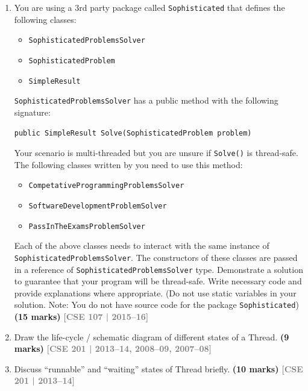 \documentclass[12pt,a3paper]{article}
\newcommand{\yr}[1]{\hfill\textcolor{gray}{\small\textbf{[#1]}}}
\newcommand{\mk}[1]{\textcolor{orange!70!black}{\small\textbf{(#1 marks)}}}
\begin{document}
\begin{enumerate}
\item You are using a 3rd party package called \texttt{Sophisticated} that defines the following classes:
\begin{itemize}
    \item \texttt{SophisticatedProblemsSolver}
    \item \texttt{SophisticatedProblem}
    \item \texttt{SimpleResult}
\end{itemize}
\texttt{SophisticatedProblemsSolver} has a public method with the following signature:
\begin{center}
    \texttt{public SimpleResult Solve(SophisticatedProblem problem)}
\centerline{}
\end{center}
Your scenario is multi-threaded but you are unsure if \texttt{Solve()} is thread-safe. The following classes written by you need to use this method:
\begin{itemize}
    \item \texttt{CompetativeProgrammingProblemsSolver}
    \item \texttt{SoftwareDevelopmentProblemSolver}
    \item \texttt{PassInTheExamsProblemSolver}
\end{itemize}
Each of the above classes needs to interact with the same instance of \texttt{SophisticatedProblemsSolver}. The constructors of these classes are passed in a reference of \texttt{SophisticatedProblemsSolver} type. Demonstrate a solution to guarantee that your program will be thread-safe. Write necessary code and provide explanations where appropriate. (Do not use static variables in your solution. Note: You do not have source code for the package \texttt{Sophisticated}) \mk{15}
\yr{CSE 107 | 2015--16}




\item Draw the life-cycle / schematic diagram of different states of a Thread. \mk{9}
\yr{CSE 201 | 2013--14, 2008--09, 2007--08}




\item Discuss ``runnable'' and ``waiting'' states of Thread briefly. \mk{10}
\yr{CSE 201 | 2013--14}





\end{enumerate}
\end{document}
